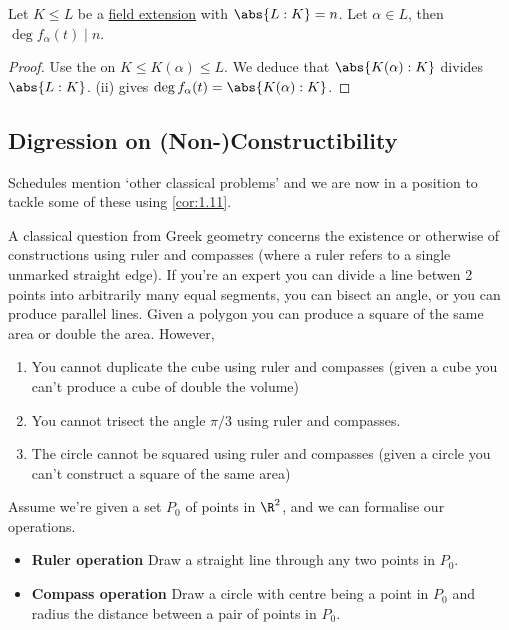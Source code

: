 \documentclass{article}
\begin{document}
\begin{ncor}\label{cor:1.11}
    Let $K \leq L$ be a \hyperlink{def:fieldExt}{field extension} with \hyperlink{def:degreeOfFieldExt}{$\abs{L:K} = n$}. Let $\alpha \in L$, then $\deg f_\alpha(t) \mid n$.
\end{ncor}

\begin{proof}
    Use the  on $K \leq K(\alpha) \leq L$.  We deduce that $\abs{K(\alpha):K}$ divides $\abs{L:K}$.  (ii) gives $\deg f_\alpha(t) = \abs{K(\alpha) : K}$.
\end{proof}

\subsection{Digression on (Non-)Constructibility}
Schedules mention `other classical problems' and we are now in a position to tackle some of these using \cref{cor:1.11}.

A classical question from Greek geometry concerns the existence or otherwise of constructions using ruler and compasses (where a ruler refers to a single unmarked straight edge).
If you're an expert you can divide a line betwen 2 points into arbitrarily many equal segments, you can bisect an angle, or you can produce parallel lines.
Given a polygon you can produce a square of the same area or double the area. However,
\begin{enumerate}
    \item You cannot duplicate the cube using ruler and compasses (given a cube you can't produce a cube of double the volume)
    \item You cannot trisect the angle $\pi/3$ using ruler and compasses.
    \item The circle cannot be squared using ruler and compasses (given a circle you can't construct a square of the same area)
\end{enumerate}

Assume we're given a set $P_0$ of points in $\R^2$, and we can formalise our operations.
\begin{itemize}[label={}, leftmargin=*]
    \item \textbf{Ruler operation} Draw a straight line through any two points in $P_0$.
    \item \textbf{Compass operation} Draw a circle with centre being a point in $P_0$ and radius the distance between a pair of points in $P_0$.
\end{itemize}
\end{document}
